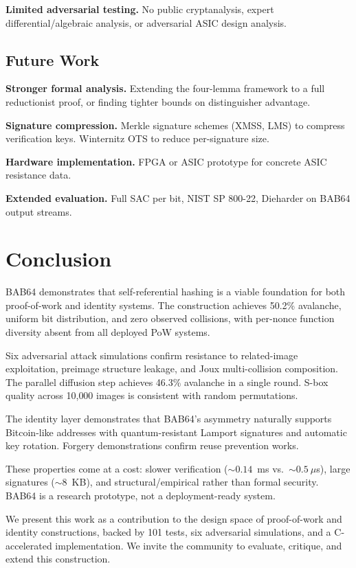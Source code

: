 \documentclass[preprint]{iacrtrans}
\begin{document}
\textbf{Limited adversarial testing.} No public cryptanalysis, expert differential/algebraic analysis, or adversarial ASIC design analysis.

\subsection{Future Work}

\textbf{Stronger formal analysis.} Extending the four-lemma framework to a full reductionist proof, or finding tighter bounds on distinguisher advantage.

\textbf{Signature compression.} Merkle signature schemes (XMSS, LMS) to compress verification keys. Winternitz OTS to reduce per-signature size.

\textbf{Hardware implementation.} FPGA or ASIC prototype for concrete ASIC resistance data.

\textbf{Extended evaluation.} Full SAC per bit, NIST SP 800-22, Dieharder on BAB64 output streams.

\section{Conclusion}

BAB64 demonstrates that self-referential hashing is a viable foundation for both proof-of-work and identity systems. The construction achieves 50.2\% avalanche, uniform bit distribution, and zero observed collisions, with per-nonce function diversity absent from all deployed PoW systems.

Six adversarial attack simulations confirm resistance to related-image exploitation, preimage structure leakage, and Joux multi-collision composition. The parallel diffusion step achieves 46.3\% avalanche in a single round. S-box quality across 10{,}000 images is consistent with random permutations.

The identity layer demonstrates that BAB64's asymmetry naturally supports Bitcoin-like addresses with quantum-resistant Lamport signatures and automatic key rotation. Forgery demonstrations confirm reuse prevention works.

These properties come at a cost: slower verification (${\sim}0.14$~ms vs.\ ${\sim}0.5~\mu$s), large signatures (${\sim}8$~KB), and structural/empirical rather than formal security. BAB64 is a research prototype, not a deployment-ready system.

We present this work as a contribution to the design space of proof-of-work and identity constructions, backed by 101 tests, six adversarial simulations, and a C-accelerated implementation. We invite the community to evaluate, critique, and extend this construction.
\end{document}
